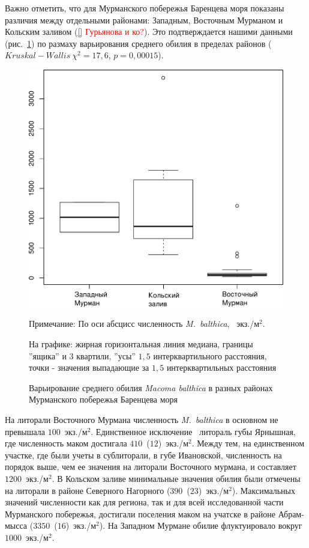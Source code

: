 \documentclass[12pt, a4paper]{disser}
\begin{document}
Важно отметить, что для Мурманского побережья Баренцева моря показаны различия между отдельными районами: Западным, Восточным Мурманом и Кольским заливом (\ref{} \textcolor{red}{Гурьянова и ко?}). 
Это подтверждается нашими данными (рис.~\ref{ris:N_region_Barents}) по размаху варьирования среднего обилия в пределах районов ($Kruskal-Wallis\ \chi^2 = 17,6$, $p = 0,00015$).
%
	\begin{figure}[h]
		\includegraphics{../All_N/Nmean_region_Barents1.pdf}
	\caption{Варьирование среднего обилия {\it Macoma balthica} в разных районах Мурманского побережья Баренцева моря}
	{\footnotesize Примечание: По оси абсцисс \textemdash численность {\it M.~balthica}, ~экз./м$^2$.

	На графике: жирная горизонтальная линия \textemdash медиана, границы ''ящика''  и 3 квартили, ''усы'' \textemdash $1,5$ интерквартильного расстояния, точки - значения выпадающие за $1,5$ интерквартильных расстояния}
	\label{ris:N_region_Barents}
	\end{figure}
%
На литорали Восточного Мурмана численность {\it M.~balthica} в основном не превышала $100$~экз./м$^2$. 
Единственное исключение \textemdash\ литораль губы Ярнышная, где численность маком достигала $410$~($12$)~экз./м$^2$. 
Между тем, на единственном участке, где были учеты в сублиторали, в губе Ивановской, численность на порядок выше, чем ее значения на литорали Восточного мурмана, и составляет $1200$~экз./м$^2$. 
В Кольском заливе минимальные значения обилия были отмечены на литорали в районе Северного Нагорного ($390$~($23$)~экз./м$^2$). 
Максимальных значений численности как для региона, так и для всей исследованной части Мурманского побережья, достигали поселения маком на учатске в районе Абрам-мысса ($3350$~($16$)~экз./м$^2$). 
На Западном Мурмане обилие флуктуировало вокруг $1000$~экз./м$^2$.  
\end{document}
